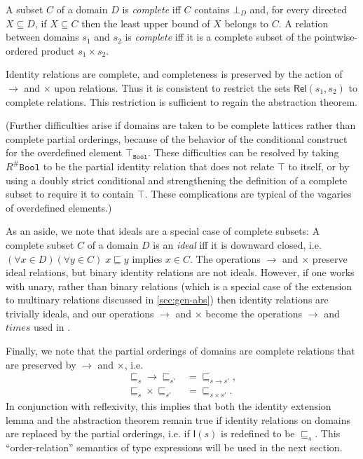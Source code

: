\documentclass[sigplan,screen,nonacm,balance=false]{acmart}
\makeatletter
\theoremstyle{plain}
\newcommand{\ie}{i.e.\@\xspace}
\newcommand{\Bool}{\mathtt{Bool}}
\newcommand{\Rel}{\mathsf{Rel}}
\newcommand{\Id}{\mathsf{I}}
\makeatother
\begin{document}
A subset $C$ of a domain $D$ is \emph{complete} iff $C$ contains $\bot_{D}$ and, for every directed $X \subseteq D$, if $X \subseteq C$ then the least upper bound of $X$ belongs to $C$.
A relation between domains $s_1$ and $s_2$ is \emph{complete} iff it is a complete subset of the pointwise-ordered product $s_1 \times s_2$.

Identity relations are complete, and completeness is preserved by the action of $\to$ and $\times$ upon relations.
Thus it is consistent to restrict the sets $\Rel(s_1, s_2)$ to complete relations.
This restriction is sufficient to regain the abstraction theorem.

(Further difficulties arise if domains are taken to be complete lattices rather than complete partial orderings, because of the behavior of the conditional construct for the overdefined element $\top_{\Bool}$.
These difficulties can be resolved by taking $R^\# \Bool$ to be the partial identity relation that does not relate $\top$ to itself, or by using a doubly strict conditional and strengthening the definition of a complete subset to require it to contain $\top$.
These complications are typical of the vagaries of overdefined elements.)

As an aside, we note that ideals are a special case of complete subsets:
A complete subset $C$ of a domain $D$ is an \emph{ideal} iff it is downward closed, \ie $(\forall x \in D) (\forall y \in C) \; x \sqsubseteq y$ implies $x \in C$.
The operations $\to$ and $\times$ preserve ideal relations, but binary identity relations are not ideals.
However, if one works with unary, rather than binary relations (which is a special case of the extension to multinary relations discussed in \cref{sec:gen-abs}) then identity relations are trivially ideals, and our operations $\to$ and $\times$ become the operations \mbox{$\to$} and \mbox{$times$} used in \citep{applicative}.

Finally, we note that the partial orderings of domains are complete relations that are preserved by $\to$ and $\times$, \ie
%
\begin{align*}
  {} \sqsubseteq_s {} \to {} \sqsubseteq_{s'} {} &= {} \sqsubseteq_{s \to s'} {}, \\
  {} \sqsubseteq_s {} \times {} \sqsubseteq_{s'} {} &= {} \sqsubseteq_{s \times s'} {}.
\end{align*}
%
In conjunction with reflexivity, this implies that both the identity extension lemma and the abstraction theorem remain true if identity relations on domains are replaced by the partial orderings, \ie if $\Id(s)$ is redefined to be $\sqsubseteq_s$.
This ``order-relation'' semantics of type expressions will be used in the next section.
\end{document}
